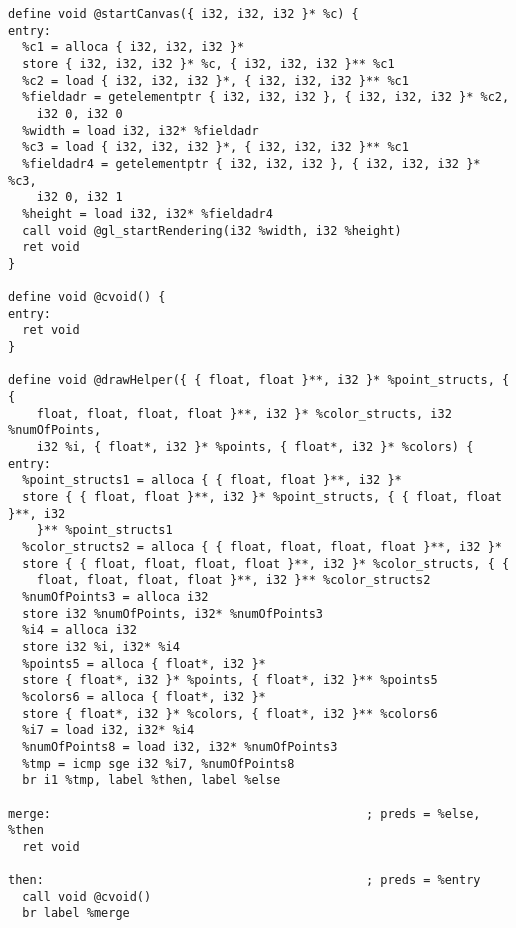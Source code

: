 \documentclass[main.tex]{subfiles}
\begin{document}
{\begin{lstlisting}
define void @startCanvas({ i32, i32, i32 }* %c) {
entry:
  %c1 = alloca { i32, i32, i32 }*
  store { i32, i32, i32 }* %c, { i32, i32, i32 }** %c1
  %c2 = load { i32, i32, i32 }*, { i32, i32, i32 }** %c1
  %fieldadr = getelementptr { i32, i32, i32 }, { i32, i32, i32 }* %c2, 
    i32 0, i32 0
  %width = load i32, i32* %fieldadr
  %c3 = load { i32, i32, i32 }*, { i32, i32, i32 }** %c1
  %fieldadr4 = getelementptr { i32, i32, i32 }, { i32, i32, i32 }* %c3,
    i32 0, i32 1
  %height = load i32, i32* %fieldadr4
  call void @gl_startRendering(i32 %width, i32 %height)
  ret void
}

define void @cvoid() {
entry:
  ret void
}

define void @drawHelper({ { float, float }**, i32 }* %point_structs, { { 
    float, float, float, float }**, i32 }* %color_structs, i32 %numOfPoints,
    i32 %i, { float*, i32 }* %points, { float*, i32 }* %colors) {
entry:
  %point_structs1 = alloca { { float, float }**, i32 }*
  store { { float, float }**, i32 }* %point_structs, { { float, float }**, i32
    }** %point_structs1
  %color_structs2 = alloca { { float, float, float, float }**, i32 }*
  store { { float, float, float, float }**, i32 }* %color_structs, { { 
    float, float, float, float }**, i32 }** %color_structs2
  %numOfPoints3 = alloca i32
  store i32 %numOfPoints, i32* %numOfPoints3
  %i4 = alloca i32
  store i32 %i, i32* %i4
  %points5 = alloca { float*, i32 }*
  store { float*, i32 }* %points, { float*, i32 }** %points5
  %colors6 = alloca { float*, i32 }*
  store { float*, i32 }* %colors, { float*, i32 }** %colors6
  %i7 = load i32, i32* %i4
  %numOfPoints8 = load i32, i32* %numOfPoints3
  %tmp = icmp sge i32 %i7, %numOfPoints8
  br i1 %tmp, label %then, label %else

merge:                                            ; preds = %else, %then
  ret void

then:                                             ; preds = %entry
  call void @cvoid()
  br label %merge


\end{lstlisting}}
\end{document}
